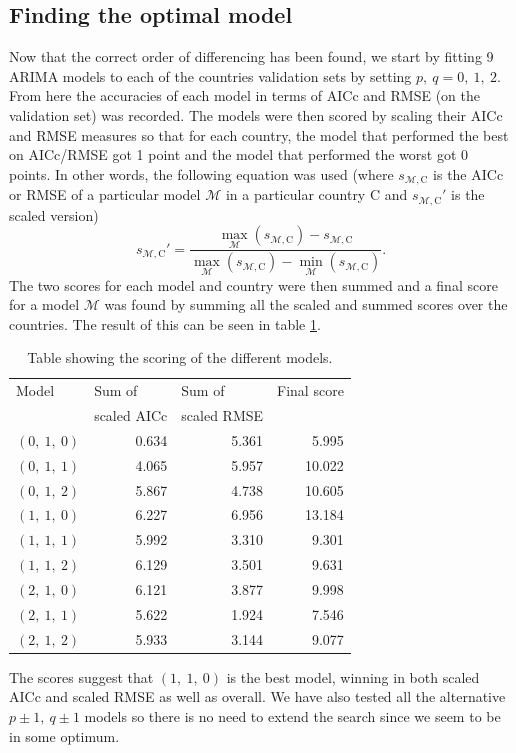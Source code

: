 \documentclass[a4paper, 12pt]{scrartcl}
\begin{document}
\subsection{Finding the optimal model}
Now that the correct order of differencing has been found, we start by fitting 9 ARIMA models to each of the countries validation sets  by setting $p,~q=0,~1,~2$.
From here the accuracies of each model in terms of AICc and RMSE (on the validation set) was recorded.
The models were then scored by scaling their AICc and RMSE measures so that for each country, the model that performed the best on AICc/RMSE got 1 point and the model that performed the worst got 0 points.
In other words, the following equation was used (where $s_{\mathcal{M},\mathrm{C}}$ is the AICc or RMSE of a particular model $\mathcal{M}$ in a particular country $\mathrm{C}$ and $s_{\mathcal{M},\mathrm{C}}'$ is the scaled version)
\begin{equation*}
	s_{\mathcal{M},\mathrm{C}}'=\frac{\max_\mathcal{M}(s_{\mathcal{M},\mathrm{C}})-s_{\mathcal{M},\mathrm{C}}}{\max_\mathcal{M}(s_{\mathcal{M},\mathrm{C}})-\min_\mathcal{M}(s_{\mathcal{M},\mathrm{C}})}.
\end{equation*}
The two scores for each model and country were then summed and a final score for a model $\mathcal{M}$ was found by summing all the scaled and summed scores over the countries.
The result of this can be seen in table \ref{tbl:scores}.
\begin{table}
	\centering
	\begin{tabular}{l|rrr}
		Model & \multicolumn{1}{l}{Sum of} & \multicolumn{1}{l}{Sum of} & \multicolumn{1}{l}{Final score}\\
		& \multicolumn{1}{l}{scaled AICc} & \multicolumn{1}{l}{scaled RMSE} &\\
		\hline
		$( 0 ,~ 1 ,~ 0 )$ &0.634 &	5.361 &	~5.995\\
		$( 0 ,~ 1 ,~ 1 )$ &4.065 &	5.957 &	10.022\\
		$( 0 ,~ 1 ,~ 2 )$ &5.867 &	4.738 &	10.605\\
		$( 1 ,~ 1 ,~ 0 )$ &6.227 &	6.956 &	13.184\\
		$( 1 ,~ 1 ,~ 1 )$ &5.992 &	3.310 & ~9.301\\
		$( 1 ,~ 1 ,~ 2 )$ &6.129 &	3.501 &	~9.631\\
		$( 2 ,~ 1 ,~ 0 )$ &6.121 &	3.877 &	~9.998\\
		$( 2 ,~ 1 ,~ 1 )$ &5.622 &	1.924 &	~7.546\\
		$( 2 ,~ 1 ,~ 2 )$ &5.933 &	3.144 &	~9.077
	\end{tabular}
\caption{Table showing the scoring of the different models.\label{tbl:scores}}
\end{table}
The scores suggest that $( 1 ,~ 1 ,~ 0 )$ is the best model, winning in both scaled AICc and scaled RMSE as well as overall.
We have also tested all the alternative $p\pm 1,~q\pm 1$ models so there is no need to extend the search since we seem to be in some optimum.
\end{document}
